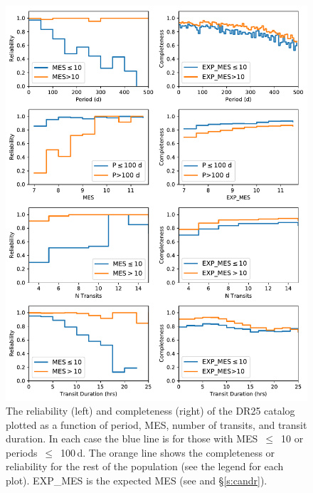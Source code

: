 \begin{figure}[hp]
 \begin{center}
  \includegraphics[width=0.875\linewidth]{f9.pdf}
  \caption{The reliability (left) and completeness (right)  of the DR25 catalog plotted as a function of period, MES, number of transits, and transit duration. In each case the blue line is for those with MES~$\leq$~10 or periods~$\leq$~100\,d. The orange line shows the completeness or reliability for the rest of the population (see the legend for each plot). EXP\_MES is the expected MES (see \citealt{Christiansen2017} and \S\ref{s:candr}).}
  \label{f:1dcompare}
 \end{center}
 \end{figure}


